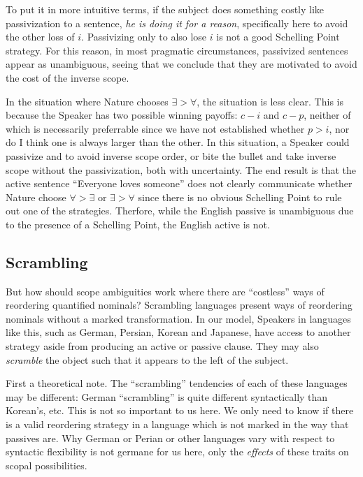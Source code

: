 \documentclass{article}
\begin{document}
\begin{exe}
\end{exe}

To put it in more intuitive terms, if the subject does something costly like passivization to a sentence, \emph{he is doing it for a reason}, specifically here to avoid the other loss of $i$.
Passivizing only to also lose $i$ is not a good Schelling Point strategy.
For this reason, in most pragmatic circumstances, passivized sentences appear as unambiguous, seeing that we conclude that they are motivated to avoid the cost of the inverse scope.

In the situation where Nature chooses ${\exists}>{\forall}$, the situation is less clear.
This is because the Speaker has two possible winning payoffs: $c-i$ and $c-p$, neither of which is necessarily preferrable since we have not established whether $p>i$, nor do I think one is always larger than the other.
In this situation, a Speaker could passivize and to avoid inverse scope order, or bite the bullet and take inverse scope without the passivization, both with uncertainty.
The end result is that the active sentence ``Everyone loves someone'' does not clearly communicate whether Nature choose ${\forall}>{\exists}$ or ${\exists}>{\forall}$ since there is no obvious Schelling Point to rule out one of the strategies. Therfore, while the English passive is unambiguous due to the presence of a Schelling Point, the English active is not.

\subsection{Scrambling\label{scramb}}

But how should scope ambiguities work where there are ``costless'' ways of reordering quantified nominals? Scrambling languages present ways of reordering nominals without a marked transformation. In our model, Speakers in languages like this, such as German, Persian, Korean and Japanese, have access to another strategy aside from producing an active or passive clause. They may also \emph{scramble} the object such that it appears to the left of the subject.

First a theoretical note.
The ``scrambling'' tendencies of each of these languages may be different: German ``scrambling'' is quite different syntactically than Korean's, etc.
This is not so important to us here.
We only need to know if there is a valid reordering strategy in a language which is not marked in the way that passives are.
Why German or Perian or other languages vary with respect to syntactic flexibility is not germane for us here, only the \emph{effects} of these traits on scopal possibilities.
\end{document}

